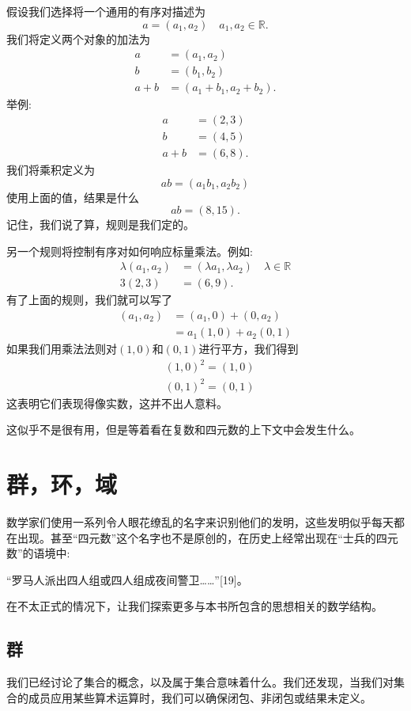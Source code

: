 假设我们选择将一个通用的有序对描述为
$$
a=\left(a_{1}, a_{2}\right) \quad a_{1}, a_{2} \in \mathbb{R} .
$$
我们将定义两个对象的加法为
$$
\begin{aligned}
a & =\left(a_{1}, a_{2}\right) \\
b & =\left(b_{1}, b_{2}\right) \\
a+b & =\left(a_{1}+b_{1}, a_{2}+b_{2}\right) .
\end{aligned}
$$
举例:
$$
\begin{aligned}
a & =(2,3) \\
b & =(4,5) \\
a+b & =(6,8) .
\end{aligned}
$$
我们将乘积定义为
$$
a b=\left(a_{1} b_{1}, a_{2} b_{2}\right)
$$
使用上面的值，结果是什么
$$
a b=(8,15) .
$$
记住，我们说了算，规则是我们定的。

另一个规则将控制有序对如何响应标量乘法。例如:
$$
\begin{aligned}
\lambda\left(a_{1}, a_{2}\right) & =\left(\lambda a_{1}, \lambda a_{2}\right) \quad \lambda \in \mathbb{R} \\
3(2,3) & =(6,9) .
\end{aligned}
$$
有了上面的规则，我们就可以写了
$$
\begin{aligned}
\left(a_{1}, a_{2}\right) & =\left(a_{1}, 0\right)+\left(0, a_{2}\right) \\
& =a_{1}(1,0)+a_{2}(0,1)
\end{aligned}
$$
如果我们用乘法法则对$(1,0)$和$(0,1)$进行平方，我们得到
$$
\begin{aligned}
& (1,0)^{2}=(1,0) \\
& (0,1)^{2}=(0,1)
\end{aligned}
$$
这表明它们表现得像实数，这并不出人意料。

这似乎不是很有用，但是等着看在复数和四元数的上下文中会发生什么。

\section{群，环，域}
数学家们使用一系列令人眼花缭乱的名字来识别他们的发明，这些发明似乎每天都在出现。甚至“四元数”这个名字也不是原创的，在历史上经常出现在“士兵的四元数”的语境中:

“罗马人派出四人组或四人组成夜间警卫……”[19]。

在不太正式的情况下，让我们探索更多与本书所包含的思想相关的数学结构。

\subsection{群}
我们已经讨论了集合的概念，以及属于集合意味着什么。我们还发现，当我们对集合的成员应用某些算术运算时，我们可以确保闭包、非闭包或结果未定义。

